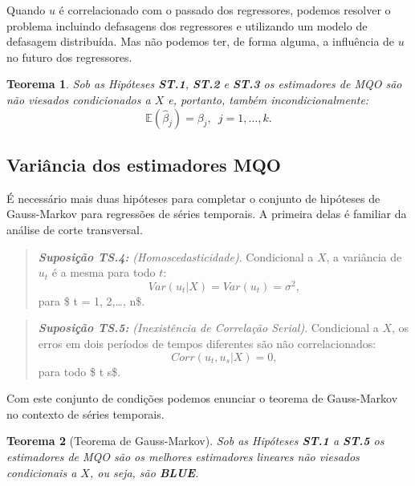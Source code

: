 \documentclass[
]{book}
\newtheorem{theorem}{Teorema}[chapter]
\theoremstyle{definition}
\theoremstyle{definition}
\theoremstyle{definition}
\theoremstyle{remark}
\begin{document}
Quando \(u\) é correlacionado com o passado dos regressores, podemos resolver o problema incluindo defasagens dos regressores e utilizando um modelo de defasagem distribuída. Mas não podemos ter, de forma alguma, a influência de \(u\) no futuro dos regressores.

\begin{theorem}
\protect\hypertarget{thm:teovies}{}{\label{thm:teovies} } Sob as Hipóteses \textbf{ST.1}, \textbf{ST.2} e \textbf{ST.3} os estimadores de MQO são não viesados condicionados a \(X\) e, portanto, também incondicionalmente:
\begin{equation*}
   \mathbb{E}(\hat{\beta}_j)=\beta_j, \,\,\,j=1,\ldots,k.
 \end{equation*}
\end{theorem}

\hypertarget{variuxe2ncia-dos-estimadores-mqo}{%
\subsection{Variância dos estimadores MQO}\label{variuxe2ncia-dos-estimadores-mqo}}

É necessário mais duas hipóteses para completar o conjunto de hipóteses de Gauss-Markov para
regressões de séries temporais. A primeira delas é familiar da análise de corte transversal.

\begin{quote}
\textbf{\emph{Suposição TS.4:}} \emph{(Homoscedasticidade)}. Condicional a \(X\), a variância de \(u_t\) é a mesma para todo \(t\):
\[Var(u_t | X) = Var(u_t)=\sigma^2,\] para \$ t = 1, 2,\ldots, n\$.
\end{quote}

\begin{quote}
\textbf{\emph{Suposição TS.5:}} \emph{(Inexistência de Correlação Serial)}.
Condicional a \(X\), os erros em dois períodos de tempos diferentes são não correlacionados:
\[Corr(u_t ,u_s| X) =0,\] para todo \$ t \neq s\$.
\end{quote}

Com este conjunto de condições podemos enunciar o teorema de Gauss-Markov no contexto de séries temporais.

\begin{theorem}[Teorema de Gauss-Markov]
\protect\hypertarget{thm:teogm}{}{\label{thm:teogm} {} }Sob as Hipóteses \textbf{ST.1} a \textbf{ST.5} os estimadores de MQO são os melhores estimadores lineares não viesados condicionais a \(X\), ou seja, são \textbf{\emph{BLUE}}.
\end{theorem}
\end{document}
